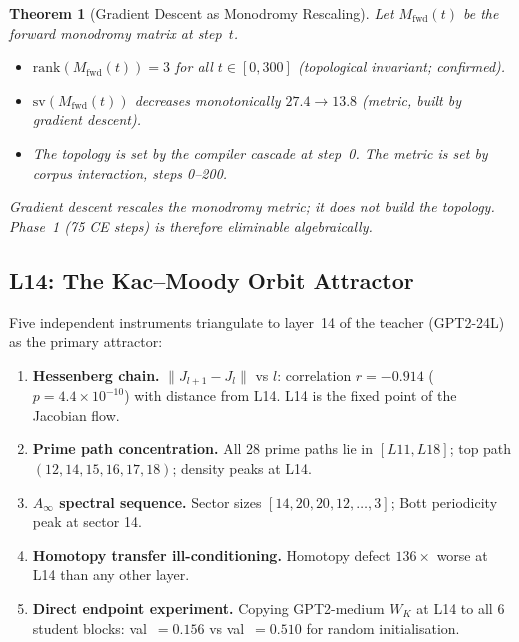 \documentclass[11pt]{amsart}
\newtheorem{theorem}{Theorem}[section]
\begin{document}
\begin{theorem}[Gradient Descent as Monodromy Rescaling]
\label{thm:monodromy}
Let $M_\mathrm{fwd}(t)$ be the forward monodromy matrix at step~$t$.
\begin{itemize}
  \item $\mathrm{rank}(M_\mathrm{fwd}(t)) = 3$ for all $t\in[0,300]$
    (topological invariant; confirmed).
  \item $\mathrm{sv}(M_\mathrm{fwd}(t))$ decreases monotonically
    $27.4 \to 13.8$ (metric, built by gradient descent).
  \item The topology is set by the compiler cascade at step~0.
    The metric is set by corpus interaction, steps 0--200.
\end{itemize}
Gradient descent rescales the monodromy metric;
it does not build the topology.
Phase~1 (75 CE steps) is therefore eliminable algebraically.
\end{theorem}

\subsection{L14: The Kac--Moody Orbit Attractor}

Five independent instruments triangulate to layer~14 of the
teacher (GPT2-24L) as the primary attractor:

\begin{enumerate}
  \item \textbf{Hessenberg chain.}
    $\|J_{l+1}-J_l\|$ vs $l$: correlation $r=-0.914$
    ($p=4.4\times10^{-10}$) with distance from L14.
    L14 is the fixed point of the Jacobian flow.

  \item \textbf{Prime path concentration.}
    All 28 prime paths lie in $[L11,L18]$;
    top path $(12,14,15,16,17,18)$; density peaks at L14.

  \item \textbf{$A_\infty$ spectral sequence.}
    Sector sizes $[14,20,20,12,\ldots,3]$;
    Bott periodicity peak at sector 14.

  \item \textbf{Homotopy transfer ill-conditioning.}
    Homotopy defect $136\times$ worse at L14 than any other layer.

  \item \textbf{Direct endpoint experiment.}
    Copying GPT2-medium $W_K$ at L14 to all 6 student blocks:
    val~$=0.156$ vs val~$=0.510$ for random initialisation.
\end{enumerate}
\end{document}
